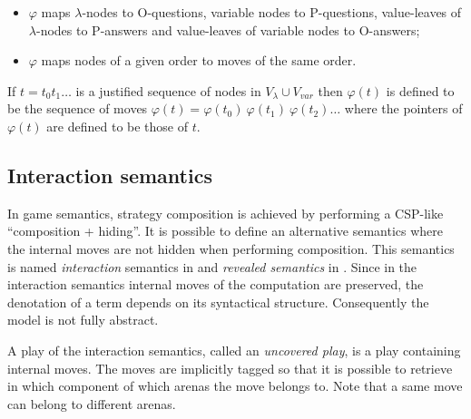 \documentclass{llncs}
\newcommand\union{\cup}
\begin{document}
\begin{remark}
\begin{itemize}
\item $\varphi$ maps $\lambda$-nodes to O-questions, variable nodes to
P-questions, value-leaves of $\lambda$-nodes to P-answers and
value-leaves of variable nodes to O-answers;
\item $\varphi$ maps nodes of a given order to moves of the same order.
\end{itemize}
\end{remark}
If $t = t_0 t_1 \ldots$ is a justified sequence
of nodes in $V_\lambda \union V_{var}$ then $\varphi(t)$ is defined
to be the sequence of moves $\varphi(t) = \varphi(t_0)\ \varphi(t_1)\  \varphi(t_2) \ldots$
where the pointers of $\varphi(t)$ are defined to be those
of $t$.



\subsection{Interaction semantics}
\label{sec:interaction_semantics}

In game semantics, strategy composition is achieved by performing a
CSP-like ``composition + hiding''. It is possible to define an
alternative semantics where the internal moves are not hidden when
performing composition. This semantics is named \emph{interaction}
semantics in \cite{DBLP:conf/sas/DimovskiGL05} and \emph{revealed
semantics} in \cite{willgreenlandthesis}. Since in the interaction semantics internal moves of the computation are preserved, the denotation of a term depends on its syntactical structure. Consequently the model is not fully abstract.


A play of the interaction semantics, called an \emph{uncovered play}, is a play containing internal moves.
The moves are implicitly tagged so that it is possible to retrieve in which component
of which arenas the move belongs to. Note that a same move can belong to different arenas.
\end{document}
